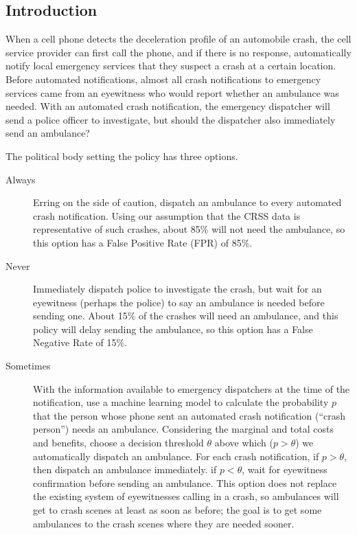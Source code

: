 
\subsection{Introduction}

When a cell phone detects the deceleration profile of an automobile crash, the cell service provider can first call the phone, and if there is no response, automatically notify local emergency services that they suspect a crash at a certain location.  Before automated notifications, almost all crash notifications to emergency services came from an eyewitness who would report whether an ambulance was needed.  With an automated crash notification, the emergency dispatcher will send a police officer to investigate, but should the dispatcher also immediately send an ambulance?  

The political body setting the policy has three options.  

\begin{description}
	\item [Always] Erring on the side of caution, dispatch an ambulance  to every automated crash notification.  Using our assumption that the CRSS data is representative of such crashes, about 85\% will not need the ambulance, so this option has a False Positive Rate (FPR) of 85\%.
	\item [Never] Immediately dispatch police to investigate the crash, but wait for an eyewitness (perhaps the police) to say an ambulance is needed before sending one.  About 15\% of the crashes will need an ambulance, and this policy will delay sending the ambulance, so this option has a False Negative Rate of 15\%.
	\item [Sometimes]  With the information available to emergency dispatchers at the time of the notification, use a machine learning model to calculate the probability $p$ that the person whose phone sent an automated crash notification (``crash person'') needs an ambulance.  Considering the marginal and total costs and benefits, choose a decision threshold $\theta$ above which ($p > \theta$) we automatically dispatch an ambulance.  For each crash notification, if $p > \theta$, then dispatch an ambulance immediately. if $p<\theta$, wait for eyewitness confirmation before sending an ambulance.  This option does not replace the existing system of eyewitnesses calling in a crash, so ambulances will get to crash scenes at least as soon as before; the goal is to get some ambulances to the crash scenes where they are needed sooner. 
\end{description}

